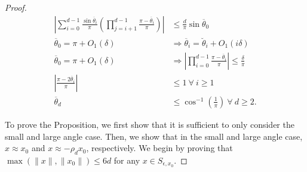 \documentclass{article}
\begin{document}
\begin{proof}
\begin{align}
\left|\sum_{i=0}^{d-1} \frac{\sin \overline{\theta}_i}{\pi}\left(\prod_{j=i+1}^{d-1} \frac{\pi - \overline{\theta}_i}{\pi}\right)\right| & \leq \frac{d}{\pi}\sin \overline{\theta}_0 \label{sum_prod_upperbound}\\
\overline{\theta}_0 = \pi + O_1(\delta) & \Longrightarrow \overline{\theta}_i = \breve{\theta}_i + O_1(i\delta) \label{pi_Oone_bound}\\
\overline{\theta}_0 = \pi + O_1(\delta) & \Longrightarrow \left|\prod_{i=0}^{d-1}\frac{\pi - \overline{\theta}_i}{\pi}\right| \leq \frac{\delta}{\pi} \\
\left|\frac{\pi - 2\overline{\theta}_i}{\pi}\right| & \leq 1\ \forall\ i \geq 1 \label{pi_twotheta_upperbound} \\
\overline{\theta}_d & \leq \cos^{-1}\left(\frac{1}{\pi}\right)\ \forall\ d \geq 2. \label{cos_inv_bound}
\end{align}

To prove the Proposition, we first show that it is sufficient to only consider the small and large angle case. Then, we show that in the small and large angle case, $x \approx x_0$ and $x \approx -\rho_d x_0$, respectively. We begin by proving that $\max(\|x\|,\|x_0\|) \leq 6d$ for any $x \in S_{\epsilon,x_0}$.


\end{proof}
\end{document}
